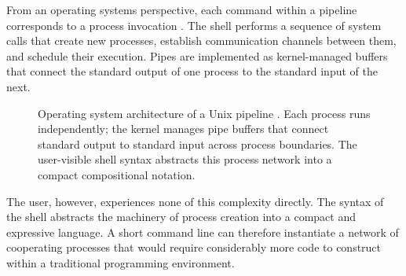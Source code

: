 \documentclass[12pt]{article}
\theoremstyle{definition}
\begin{document}
From an operating systems perspective, each command within a pipeline
corresponds to a process invocation \cite{ritchie1974}. The shell
performs a sequence of system calls that create new processes, establish
communication channels between them, and schedule their execution. Pipes
are implemented as kernel-managed buffers that connect the standard
output of one process to the standard input of the next.

\begin{figure}[h]
\centering
{}
\caption{Operating system architecture of a Unix pipeline \cite{ritchie1974}.
Each process runs independently; the kernel manages pipe buffers that
connect standard output to standard input across process boundaries.
The user-visible shell syntax abstracts this process network into a
compact compositional notation.}
\label{fig:os_pipeline}
\end{figure}

The user, however, experiences none of this complexity directly. The
syntax of the shell abstracts the machinery of process creation into a
compact and expressive language. A short command line can therefore
instantiate a network of cooperating processes that would require
considerably more code to construct within a traditional programming
environment.
\end{document}

